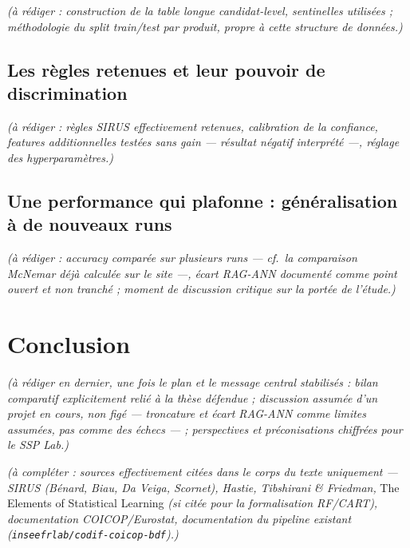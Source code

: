 \documentclass[
]{rapportCS}
\begin{document}
\emph{(à rédiger : construction de la table longue candidat-level,
sentinelles utilisées ; méthodologie du split train/test par produit,
propre à cette structure de données.)}

\subsection{Les règles retenues et leur pouvoir de
discrimination}\label{les-ruxe8gles-retenues-et-leur-pouvoir-de-discrimination}

\emph{(à rédiger : règles SIRUS effectivement retenues, calibration de
la confiance, features additionnelles testées sans gain --- résultat
négatif interprété ---, réglage des hyperparamètres.)}

\subsection{Une performance qui plafonne : généralisation à de nouveaux
runs}\label{une-performance-qui-plafonne-guxe9nuxe9ralisation-uxe0-de-nouveaux-runs}

\emph{(à rédiger : accuracy comparée sur plusieurs runs --- cf.~la
comparaison McNemar déjà calculée sur le site ---, écart RAG-ANN
documenté comme point ouvert et non tranché ; moment de discussion
critique sur la portée de l'étude.)}

\newpage

\section{Conclusion}\label{conclusion}

\emph{(à rédiger en dernier, une fois le plan et le message central
stabilisés : bilan comparatif explicitement relié à la thèse défendue ;
discussion assumée d'un projet en cours, non figé --- troncature et
écart RAG-ANN comme limites assumées, pas comme des échecs --- ;
perspectives et préconisations chiffrées pour le SSP Lab.)}

\newpage
{}

\emph{(à compléter : sources effectivement citées dans le corps du texte
uniquement --- SIRUS (Bénard, Biau, Da Veiga, Scornet), Hastie,
Tibshirani \& Friedman,} The Elements of Statistical Learning \emph{(si
citée pour la formalisation RF/CART), documentation COICOP/Eurostat,
documentation du pipeline existant
(\texttt{inseefrlab/codif-coicop-bdf}).)}

\newpage
\annexes
\end{document}
